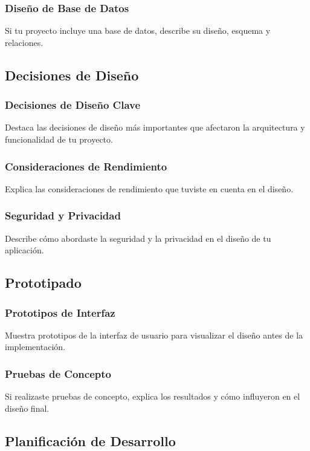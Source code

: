 \subsubsection{Diseño de Base de Datos}
Si tu proyecto incluye una base de datos, describe su diseño, esquema y relaciones.

\subsection{Decisiones de Diseño}

\subsubsection{Decisiones de Diseño Clave}
Destaca las decisiones de diseño más importantes que afectaron la arquitectura y funcionalidad de tu proyecto.

\subsubsection{Consideraciones de Rendimiento}
Explica las consideraciones de rendimiento que tuviste en cuenta en el diseño.

\subsubsection{Seguridad y Privacidad}
Describe cómo abordaste la seguridad y la privacidad en el diseño de tu aplicación.

\subsection{Prototipado}

\subsubsection{Prototipos de Interfaz}
Muestra prototipos de la interfaz de usuario para visualizar el diseño antes de la implementación.

\subsubsection{Pruebas de Concepto}
Si realizaste pruebas de concepto, explica los resultados y cómo influyeron en el diseño final.

\subsection{Planificación de Desarrollo}

